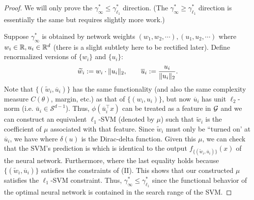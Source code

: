 \begin{proof}

We will only prove the $\gamma_{\infty}^* \leq \gamma_{\ell_1}^*$ direction. (The $\gamma_{\infty}^* \geq \gamma_{\ell_1}^*$ direction is essentially the same but requires slightly more work.)

Suppose $\gamma_\infty^*$ is obtained by network weights $(w_1,w_2, \cdots), (u_1, u_2, \cdots)$ where $w_i\in \mathbb R, u_i\in \mathbb R^d$ (there is a slight subtlety here to be rectified later). Define renormalized versions of $\{w_i\}$ and $\{u_i\}$:
\begin{equation}
\widetilde w_i := w_i\cdot \|u_i\|_2, \qquad \overline u_i := \frac {u_i} {\|u_i\|_2}.   
\end{equation}
Note that $\{(\widetilde w_i, \overline u_i)\}$ has the same functionality (and also the same complexity measure $C(\theta)$, margin, etc.) as that of $\{(w_i,u_i)\}$, but now $\overline u_i$ has unit $\ell_2$-norm (i.e. $\bar{u}_i \in \mathcal{S}^{d-1}$). Thus, $\phi(\overline u_i ^\top x)$ can be treated as a feature in $\mathcal G$ and we can construct an equivalent $\ell_1$-SVM (denoted by $\mu$) such that $\widetilde w_i$ is the coefficient of $\mu$ associated with that feature. Since $\widetilde w_i$ must only be ``turned on' at $\overline u_i $, we have 
where $ \delta(u)$ is the Dirac-delta function. Given this $\mu$, we can check that the SVM's prediction is
which is identical to the output $f_{\{(\widetilde w_i, \overline u_i)\}}(x)$ of the neural network. Furthermore, 
where the last equality holds because $\{(\widetilde w_i, \overline u_i)\}$ satisfies the constraints of (II). This shows that our constructed $\mu$ satisfies the $\ell_1$-SVM constraint. Thus, $\gamma_{\infty}^* \leq \gamma_{\ell_1}^*$ since the functional behavior of the optimal neural network is contained in the search range of the SVM.

\end{proof}

